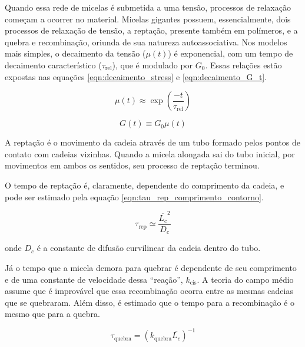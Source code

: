 		Quando essa rede de micelas é submetida a uma tensão, processos de relaxação começam a ocorrer no material. Micelas gigantes possuem, essencialmente, dois processos de relaxação de tensão, a reptação, presente também em polímeros, e a quebra e recombinação, oriunda de sua natureza autoassociativa. Nos modelos mais simples, o decaimento da tensão (\(\mu(t)\)) é exponencial, com um tempo de decaimento característico (\(\tau_{\mathrm{rel}}\)), que é modulado por \(G_0\). Essas relações estão expostas nas equações \ref{eqn:decaimento_stress} e \ref{eqn:decaimento_G_t}.
		
		\begin{equation}
			\mu(t)  \approx \exp \left(  \frac{-t}{\tau_{\mathrm{rel}}} \right)
			\label{eqn:decaimento_stress}
		\end{equation} %
		
		\begin{equation}
			G(t) \equiv G_0 \mu(t)	
			\label{eqn:decaimento_G_t}
		\end{equation} %
		
		A reptação é o movimento da cadeia através de um tubo formado pelos pontos de contato com cadeias vizinhas. Quando a micela alongada sai do tubo inicial, por movimentos em ambos os sentidos, seu processo de reptação terminou.
		
		
		O tempo de reptação é, claramente, dependente do comprimento da cadeia, e pode ser estimado pela equação \ref{eqn:tau_rep_comprimento_contorno}.
		
		\begin{equation}
			\tau_\mathrm{rep} \simeq \frac{\overline{L_c}^2}{D_c}
			\label{eqn:tau_rep_comprimento_contorno}
		\end{equation} %
		
		\noindent onde \(D_c\) é a constante de difusão curvilinear da cadeia dentro do tubo.
		
		Já o tempo que a micela demora para quebrar é dependente de seu comprimento e de uma constante de velocidade dessa ``reação'', \(k_\mathrm{cis}\). A teoria do campo médio assume que é improvável que essa recombinação ocorra entre as mesmas cadeias que se quebraram. Além disso, é estimado que o tempo para a recombinação é o mesmo que para a quebra.
		
		\begin{equation}
			\tau_{\mathrm{quebra}} = \left(k_\mathrm{quebra}\overline{L_c}\right)^{-1}
			\label{eqn:tempo_quebra_comp_contorno}
		\end{equation} %
		
